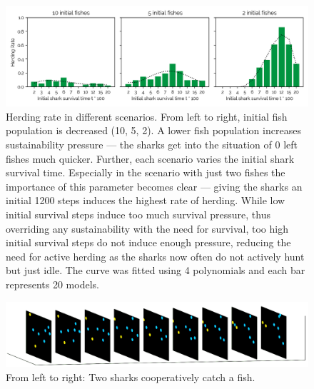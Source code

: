 \documentclass[letterpaper]{article}
\begin{document}
\begin{figure}[t]
\begin{center}
\includegraphics[width=.9\textwidth]{figures/herding.png}
    \caption{Herding rate in different scenarios. From left to right, initial fish population is decreased (10, 5, 2). A lower fish population increases sustainability pressure --- the sharks get into the situation of 0 left fishes much quicker. Further, each scenario varies the initial shark survival time. Especially in the scenario with just two fishes the importance of this parameter becomes clear --- giving the sharks an initial 1200 steps induces the highest rate of herding. While low initial survival steps induce too much survival pressure, thus overriding any sustainability with the need for survival, too high initial survival steps do not induce enough pressure, reducing the need for active herding as the sharks now often do not actively hunt but just idle. The curve was fitted using 4 polynomials and each bar represents 20 models.}
\label{fig:herding}
\end{center}
\end{figure}

\begin{figure}[t]
\begin{center}
\includegraphics[width=.9\textwidth]{figures/coop_movie_frames2.png}
\caption{From left to right: Two sharks cooperatively catch a fish.}
\label{fig:coop_movie}
\end{center}
\end{figure}
\end{document}
